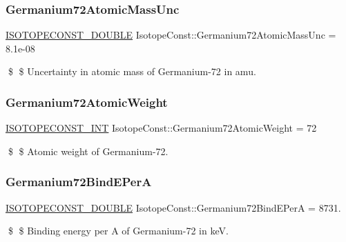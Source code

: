 \subsubsection{\texorpdfstring{Germanium72\+Atomic\+Mass\+Unc}{Germanium72AtomicMassUnc}}
{\footnotesize\ttfamily \mbox{\hyperlink{group___isotope_const-_macros_ga8f45a7272ce02c0b4c65c44636ed719a}{I\+S\+O\+T\+O\+P\+E\+C\+O\+N\+S\+T\+\_\+\+D\+O\+U\+B\+LE}} Isotope\+Const\+::\+Germanium72\+Atomic\+Mass\+Unc = 8.\+1e-\/08}

\$ \$ Uncertainty in atomic mass of Germanium-\/72 in amu. \mbox{\label{group___isotope_const-_germanium-_ge72_ga4c5b92f34cc89e4ad329ca9705bbf989}} 
\subsubsection{\texorpdfstring{Germanium72\+Atomic\+Weight}{Germanium72AtomicWeight}}
{\footnotesize\ttfamily \mbox{\hyperlink{group___isotope_const-_macros_ga5f18360b3e99483a35c32d789e62621c}{I\+S\+O\+T\+O\+P\+E\+C\+O\+N\+S\+T\+\_\+\+I\+NT}} Isotope\+Const\+::\+Germanium72\+Atomic\+Weight = 72}

\$ \$ Atomic weight of Germanium-\/72. \mbox{\label{group___isotope_const-_germanium-_ge72_ga4a4b0caa9aebfff2bb9b258888018cc2}} 
\subsubsection{\texorpdfstring{Germanium72\+Bind\+E\+PerA}{Germanium72BindEPerA}}
{\footnotesize\ttfamily \mbox{\hyperlink{group___isotope_const-_macros_ga8f45a7272ce02c0b4c65c44636ed719a}{I\+S\+O\+T\+O\+P\+E\+C\+O\+N\+S\+T\+\_\+\+D\+O\+U\+B\+LE}} Isotope\+Const\+::\+Germanium72\+Bind\+E\+PerA = 8731.}

\$ \$ Binding energy per A of Germanium-\/72 in keV. \mbox{\label{group___isotope_const-_germanium-_ge72_gad77b5001c97037ca57738ffcd13abb50}} 
